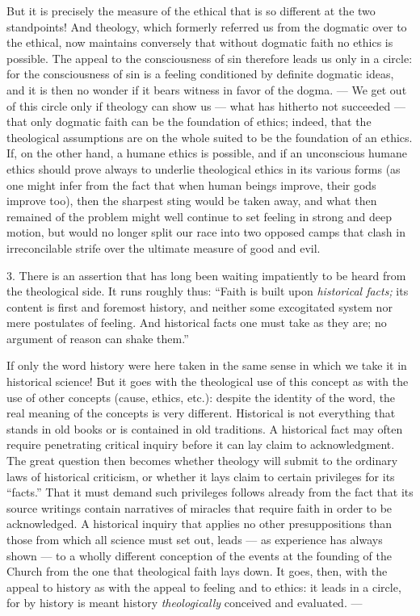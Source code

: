 \documentclass[12pt,a4paper,openany]{book}
\newcommand{\opage}[1]{\marginnote{\footnotesize\textit{[#1]}}}
\begin{document}
But it is precisely the measure of the ethical that is so different at the two
standpoints! And theology, which formerly referred us from the dogmatic over to
the ethical, now maintains conversely that without dogmatic faith no ethics is
possible. The appeal to the consciousness of sin therefore leads us only in a
circle: for the consciousness of sin is a feeling conditioned by definite
dogmatic ideas, and it is then no wonder if it bears witness in favor
of the dogma. --- We get out of this circle only if theology can show us --- what
has hitherto not succeeded --- that only dogmatic faith can be the
\opage{214}foundation of
ethics; indeed, that the theological assumptions are on the whole suited to be
the foundation of an ethics. If, on the other hand, a humane ethics is possible,
and if an unconscious humane ethics should prove always to underlie theological
ethics in its various forms (as one might infer from the fact that when human
beings improve, their gods improve too), then the sharpest sting would be taken
away, and what then remained of the problem might well continue to set feeling
in strong and deep motion, but would no longer split our race into two opposed
camps that clash in irreconcilable strife over the ultimate measure of good and
evil.

3. There is an assertion that has long been waiting impatiently to be
heard from the theological side. It runs roughly thus: ``Faith is built upon
\emph{historical facts;} its content is first and foremost history, and neither some
excogitated system nor mere postulates of feeling. And historical facts one must
take as they are; no argument of reason can shake them.''

If only the word history were here taken in the same sense in which we take it in
historical science! But it goes with the theological use of this concept as with
the use of other concepts (cause, ethics, etc.): despite the identity of the
word, the real meaning of the concepts is very different. Historical is not
everything that stands in old books or is contained in old traditions. A
historical fact may often require penetrating critical inquiry before it can lay
claim to acknowledgment. The great question then becomes whether theology will
submit to the ordinary laws of historical criticism, or whether it lays claim to
certain privileges for its ``facts.'' That it must demand such privileges follows
already from the fact that its source writings contain narratives of miracles
that require faith in order to be acknowledged. A historical inquiry that applies
no other presuppositions than those from which all science must
\opage{215}set out, leads ---
as experience has always shown --- to a wholly different conception of the events
at the founding of the Church from the one that theological faith lays down. It
goes, then, with the appeal to history as with the appeal to feeling and to
ethics: it leads in a circle, for by history is meant history \emph{theologically}
conceived and evaluated. ---
\end{document}

